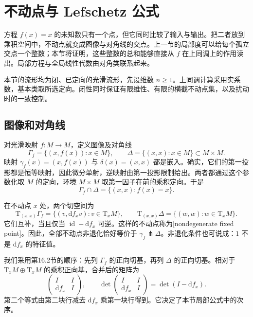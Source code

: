 
% 
% 
% 

\section{不动点与 Lefschetz 公式}
\label{g2:sec:1604}

方程 \(f(x)=x\) 的未知数只有一个点，但它同时比较了输入与输出。把二者放到乘积空间中，不动点就变成图像与对角线的交点。上一节的局部度可以给每个孤立交点一个整数；本节将证明，这些整数的总和能够直接从 \(f\) 在上同调上的作用读出。局部方程与全局线性代数由对角类联系起来。

本节的流形均为闭、已定向的光滑流形，先设维数 \(n\geq1\)。上同调计算采用实系数，基本类取所选定向。闭性同时保证有限维性、有限的横截不动点集，以及扰动时的一致控制。

\subsection{图像和对角线}
\label{g2:subsec:1604:01}

对光滑映射 \(f:M\to M\)，定义图像及对角线
\[
	\Gamma_f=\{(x,f(x)):x\in M\},
	\qquad \Delta=\{(x,x):x\in M\}\subset M\times M.
\]
映射 \(\gamma_f(x)=(x,f(x))\) 与 \(\delta(x)=(x,x)\) 都是嵌入。确实，它们的第一投影都是恒等映射，因此微分单射，逆映射由第一投影限制给出。两者都通过这个参数化取 \(M\) 的定向，环境 \(M\times M\) 取第一因子在前的乘积定向。于是
\[
	\Gamma_f\cap\Delta=\{(x,x):f(x)=x\}.
\]

在不动点 \(x\) 处，两个切空间为
\[
	\mathrm{T}_{(x,x)}\Gamma_f=\{(v,\mathrm{d}f_xv):v\in\mathrm{T}_xM\},
	\qquad \mathrm{T}_{(x,x)}\Delta=\{(w,w):w\in\mathrm{T}_xM\}.
\]
它们互补，当且仅当 \(\operatorname{id}-\mathrm{d}f_x\) 可逆。这样的不动点称为[nondegenerate fixed point]。因此，全部不动点非退化恰好等价于 \(\gamma_f\pitchfork\Delta\)。非退化条件也可说成：\(1\) 不是 \(\mathrm{d}f_x\) 的特征值。

\ProseParagraphBreak

我们采用第16.2节的顺序：先列 \(\Gamma_f\) 的正向切基，再列 \(\Delta\) 的正向切基。相对于 \(\mathrm{T}_xM\oplus\mathrm{T}_xM\) 的乘积正向基，合并后的矩阵为
\begin{equation}\label{g2:eq:graph-diagonal-determinant}
	\begin{pmatrix}I&I\\ \mathrm{d}f_x&I\end{pmatrix},
	\qquad
	\det\begin{pmatrix}I&I\\ \mathrm{d}f_x&I\end{pmatrix}
	=\det(I-\mathrm{d}f_x).
\end{equation}
第二个等式由第二块行减去 \(\mathrm{d}f_x\) 乘第一块行得到。它决定了本节局部公式中的次序。

